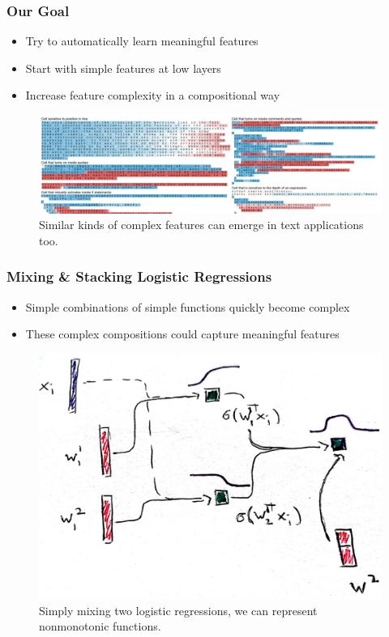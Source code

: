 \documentclass[10pt,mathserif]{beamer}
\begin{document}
\begin{frame}
  \frametitle{Our Goal}
  \begin{itemize}
  \item Try to automatically learn meaningful features
  \item Start with simple features at low layers
  \item Increase feature complexity in a compositional way
  \end{itemize}
  \begin{figure}[ht]
    \centering
    \includegraphics[width=0.8\paperwidth]{figure/high_layer_text}
    \caption{Similar kinds of complex features can emerge in text applications
      too.
      \label{fig:layer_text} }
  \end{figure}
\end{frame}

\begin{frame}
  \frametitle{Mixing \& Stacking Logistic Regressions}
  \begin{itemize}
    \item Simple combinations of simple functions quickly become complex
    \item These complex compositions could capture meaningful features
  \end{itemize}
  \begin{figure}
    \centering
    \includegraphics[width=0.55\paperwidth]{figure/mixture_logistic_2}
    \caption{Simply mixing two logistic regressions, we can represent
      nonmonotonic functions. \label{fig:mixture_logistic_2} }
  \end{figure}
\end{frame}
\end{document}

